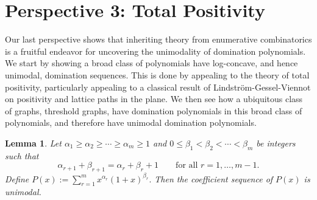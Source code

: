 \documentclass[11pt]{amsart}
\newtheorem{lemma}[theorem]{Lemma}
\numberwithin{equation}{section}
\begin{document}
\section{Perspective 3: Total Positivity}
Our last perspective shows that inheriting theory from enumerative combinatorics is a fruitful endeavor for uncovering the unimodality of domination polynomials. We start by showing a broad class of polynomials have log-concave, and hence unimodal, domination sequences. This is done by appealing to the theory of total positivity, particularly appealing to a classical result of Lindstr\"{o}m-Gessel-Viennot on positivity and lattice paths in the plane. We then see how a ubiquitous class of graphs, threshold graphs, have domination polynomials in this broad class of polynomials, and therefore have unimodal domination polynomials.

\begin{lemma}\label{lem:unimodal_staircase_binomial_sum}
Let $\alpha_1 \ge \alpha_2 \ge \cdots \ge \alpha_m \ge 1$ and $0 \le \beta_1 < \beta_2 < \cdots < \beta_m$ be integers such that
\[
\alpha_{r+1}+\beta_{r+1}=\alpha_r+\beta_r+1\qquad\text{for all }r=1,\dots,m-1.
\]
Define $P(x) := \sum_{r=1}^m x^{\alpha_r}(1+x)^{\beta_r}.$ Then the coefficient sequence of $P(x)$ is unimodal.
\end{lemma}
\end{document}
